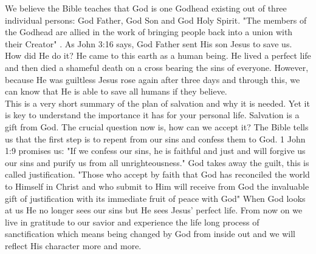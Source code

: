 We believe the Bible teaches that God is one Godhead existing out of three individual persons: God Father, God Son and God Holy Spirit. "The members of the Godhead are allied in the work of bringing people back into a union with their Creator" \citep[p. 108]{ministerial1988seventh}. As John 3:16 says, God Father sent His son Jesus to save us. How did He do it? He came to this earth as a human being. He lived a perfect life and then died a shameful death on a cross bearing the sins of everyone. However, because He was guiltless Jesus rose again after three days and through this, we can know that He is able to save all humans if they believe.\\
This is a very short summary of the plan of salvation and why it is needed. Yet it is key to understand the importance it has for your personal life. Salvation is a gift from God. The crucial question now is, how can we accept it? The Bible tells us that the first step is to repent from our sins and confess them to God. 1 John 1:9 promises us: "If we confess our sins, he is faithful and just and will forgive us our sins and purify us from all unrighteousness." God takes away the guilt, this is called justification. "Those who accept by faith that God has reconciled the world to Himself in Christ and who submit to Him will receive from God the invaluable gift of justification with its immediate fruit of peace with God" \citep[p. 32]{LaRondelle1980Salvation} When God looks at us He no longer sees our sins but He sees Jesus' perfect life. From now on we live in gratitude to our savior and experience the life long process of sanctification which means being changed by God from inside out and we will reflect His character more and more.

